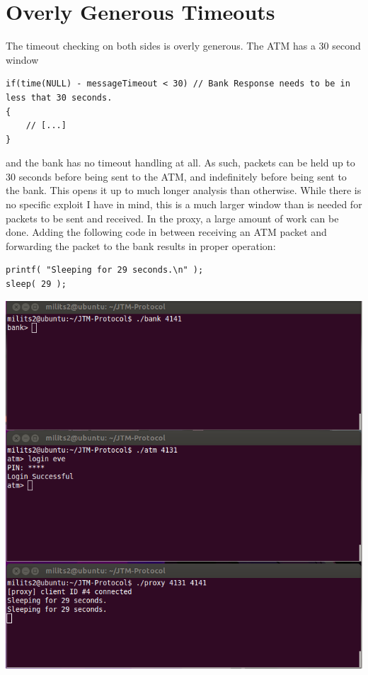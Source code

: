 \documentclass{article}
\begin{document}
\section{Overly Generous Timeouts}
The timeout checking on both sides is overly generous. The ATM has a 30 second window
\begin{lstlisting}
if(time(NULL) - messageTimeout < 30) // Bank Response needs to be in less that 30 seconds.
{
    // [...]
}
\end{lstlisting}
and the bank has no timeout handling at all. As such, packets can be held up to 30 seconds before being sent to the ATM, and indefinitely before being sent to the bank. This opens it up to much longer analysis than otherwise. While there is no specific exploit I have in mind, this is a much larger window than is needed for packets to be sent and received. In the proxy, a large amount of work can be done. Adding the following code in between receiving an ATM packet and forwarding the packet to the bank results in proper operation:
\begin{lstlisting}
printf( "Sleeping for 29 seconds.\n" );
sleep( 29 );
\end{lstlisting}
\includegraphics{slowLogin.png}
\end{document}
